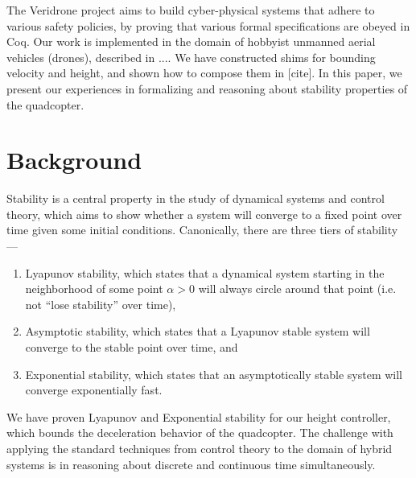 \documentclass{sigplanconf}
\begin{document}


The Veridrone project aims to build cyber-physical systems that adhere to various safety policies, by proving that various formal specifications are obeyed in Coq. Our work is implemented in the domain of hobbyist unmanned aerial vehicles (drones), described in .... We have constructed shims for bounding velocity and height, and shown how to compose them in [cite]. In this paper, we present our experiences in formalizing and reasoning about stability properties of the quadcopter.

\section{Background}


Stability is a central property in the study of dynamical systems and control theory, which aims to show whether a system will converge to a fixed point over time given some initial conditions. Canonically, there are three tiers of stability ---

\begin{enumerate}
\item Lyapunov stability, which states that a dynamical system starting in the neighborhood of some point $\alpha > 0$ will always circle around that point (i.e. not ``lose stability'' over time),

\item  Asymptotic stability, which states that a Lyapunov stable system will converge to the stable point over time, and

\item  Exponential stability, which states that an asymptotically stable system will converge exponentially fast.
\end{enumerate}


We have proven Lyapunov and Exponential stability for our height controller, which bounds the deceleration behavior of the quadcopter. The challenge with applying the standard techniques from control theory to the domain of hybrid systems is in reasoning about discrete and continuous time simultaneously.
\end{document}
